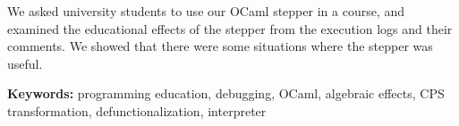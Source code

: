 We asked university students
to use our OCaml stepper in a course,
and examined the educational effects of the stepper
from the execution logs and their comments.
We showed that there were some situations where the stepper was useful.

\vspace{10mm}



{\bf Keywords:}
programming education, debugging, OCaml, algebraic effects, CPS transformation, defunctionalization, interpreter
